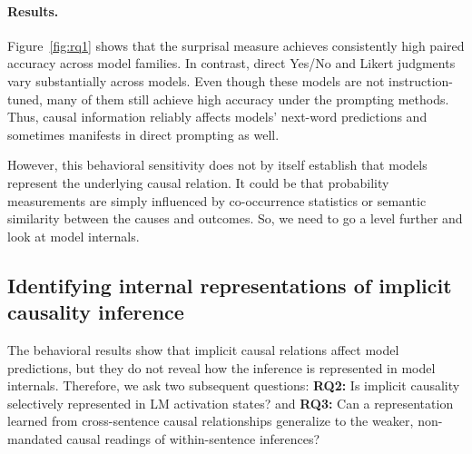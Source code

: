 \documentclass{article}
\begin{document}
\paragraph{Results.} Figure~\ref{fig:rq1} shows that the surprisal measure achieves consistently high paired accuracy across model families. In contrast, direct Yes/No and Likert judgments vary substantially across models. Even though these models are not instruction-tuned, many of them still achieve high accuracy under the prompting methods. Thus, causal information reliably affects models' next-word predictions and sometimes manifests in direct prompting as well.

However, this behavioral sensitivity does not by itself establish that models represent the underlying causal relation. It could be that probability measurements are simply influenced by co-occurrence statistics or semantic similarity between the causes and outcomes. So, we need to go a level further and look at model internals.

\subsection{Identifying internal representations of implicit causality inference}
\label{sec:representations}

The behavioral results show that implicit causal relations affect model predictions, but they do not reveal how the inference is represented in model internals. Therefore, we ask two subsequent questions: \textbf{RQ2:} Is implicit causality selectively represented in LM activation states? and \textbf{RQ3:} Can a representation learned from cross-sentence causal relationships generalize to the weaker, non-mandated causal readings of within-sentence inferences?
\end{document}
